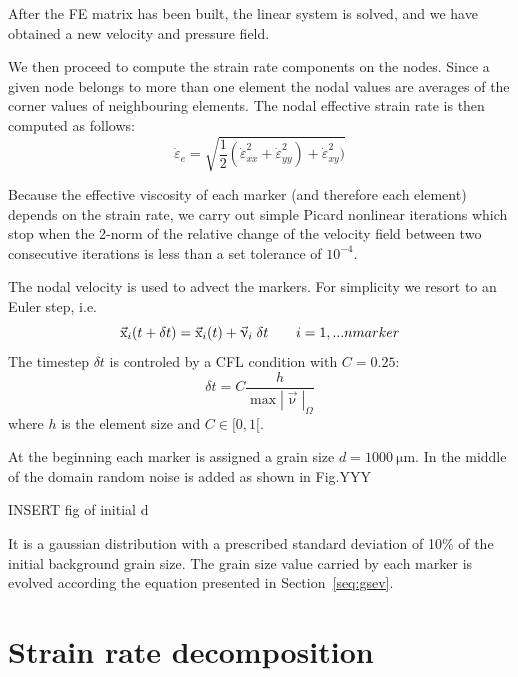 \documentclass[a4paper]{article}
\begin{document}
After the FE matrix has been built, the linear system is solved, and 
we have obtained a new velocity and pressure field.

We then proceed to compute the strain rate components on the nodes.
Since a given node belongs to more than one element the nodal values 
are averages of the corner values of neighbouring elements.
The nodal effective strain rate is then computed as follows:
\[
\dot\varepsilon_e = \sqrt{\frac12 (
\dot\varepsilon_{xx}^2+
\dot\varepsilon_{yy}^2)+
\dot\varepsilon_{xy}^2
)} 
\]

Because the effective viscosity of each marker (and therefore each element)
depends on the strain rate, we carry out simple Picard nonlinear iterations 
which stop when the 2-norm of the relative change of the velocity field between two consecutive 
iterations is less than a set tolerance of $10^{-4}$.


The nodal velocity is used to advect the markers. 
For simplicity we resort to an Euler step, i.e.
\[
\vec{\text x}_i(t+\delta t) = \vec{\text x}_i(t) + \vec\upnu_i \; \delta t
\qquad
i=1,...nmarker 
\]
The timestep $\delta t$ is controled by a CFL condition with $C=0.25$:
\[
\delta t = C \frac{h}{\max |\vec\upnu|_\Omega}
\]
where $h$ is the element size and $C\in[0,1[$.



At the beginning each marker is assigned a grain size $d=1000~\si{\micro\meter}$.
In the middle of the domain random noise is added as shown in Fig.YYY
\begin{center}
INSERT fig of initial d
\end{center}
It is a gaussian distribution with a prescribed standard deviation of 10\%
of the initial background grain size.
The grain size value carried by each marker is evolved according the 
equation presented in Section~\ref{seq:gsev}.



\section{Strain rate decomposition \label{sec:visc}}
\end{document}

